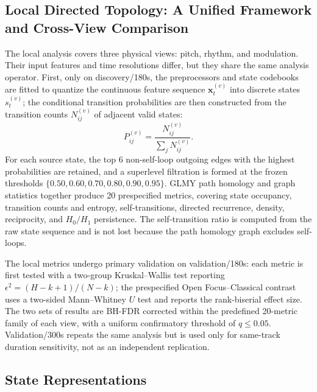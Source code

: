 \documentclass{article}
\begin{document}
\subsection{Local Directed Topology: A Unified Framework and Cross-View Comparison}

The local analysis covers three physical views: pitch, rhythm, and modulation. Their input features and time resolutions differ, but they share the same analysis operator. First, only on discovery/180s, the preprocessors and state codebooks are fitted to quantize the continuous feature sequence $\mathbf{x}^{(v)}_t$ into discrete states $s^{(v)}_t$; the conditional transition probabilities are then constructed from the transition counts $N^{(v)}_{ij}$ of adjacent valid states:
\[
P^{(v)}_{ij}=\frac{N^{(v)}_{ij}}{\sum_jN^{(v)}_{ij}}.
\]
For each source state, the top $6$ non-self-loop outgoing edges with the highest probabilities are retained, and a superlevel filtration is formed at the frozen thresholds $\{0.50,0.60,0.70,0.80,0.90,0.95\}$. GLMY path homology and graph statistics together produce 20 prespecified metrics, covering state occupancy, transition counts and entropy, self-transitions, directed recurrence, density, reciprocity, and $H_0/H_1$ persistence. The self-transition ratio is computed from the raw state sequence and is not lost because the path homology graph excludes self-loops.

The local metrics undergo primary validation on validation/180s: each metric is first tested with a two-group Kruskal--Wallis test reporting $\epsilon^2=(H-k+1)/(N-k)$; the prespecified Open Focus--Classical contrast uses a two-sided Mann--Whitney $U$ test and reports the rank-biserial effect size. The two sets of results are BH-FDR corrected within the predefined 20-metric family of each view, with a uniform confirmatory threshold of $q\le0.05$. Validation/300s repeats the same analysis but is used only for same-track duration sensitivity, not as an independent replication.

\subsection{State Representations}
\end{document}
